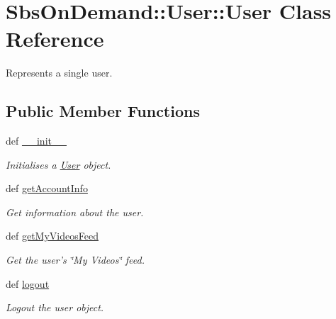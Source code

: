 \hypertarget{class_sbs_on_demand_1_1_user_1_1_user}{
\section{\-Sbs\-On\-Demand\-:\-:\-User\-:\-:\-User \-Class \-Reference}
\label{class_sbs_on_demand_1_1_user_1_1_user}
}


\-Represents a single user.  


\subsection*{\-Public \-Member \-Functions}
\begin{DoxyCompactItemize}
\item 
def \hyperlink{class_sbs_on_demand_1_1_user_1_1_user_a1d355dd122975f8c5b764ca24d115b96}{\-\_\-\-\_\-init\-\_\-\-\_\-}
\begin{DoxyCompactList}\small\item\em \-Initialises a \hyperlink{class_sbs_on_demand_1_1_user_1_1_user}{\-User} object. \end{DoxyCompactList}\item 
def \hyperlink{class_sbs_on_demand_1_1_user_1_1_user_acf32376dd3f09e4de18bebbdcb356a73}{get\-Account\-Info}
\begin{DoxyCompactList}\small\item\em \-Get information about the user. \end{DoxyCompactList}\item 
def \hyperlink{class_sbs_on_demand_1_1_user_1_1_user_aab36a7cd104fccd2b5f38d7c79eb8dcb}{get\-My\-Videos\-Feed}
\begin{DoxyCompactList}\small\item\em \-Get the user's \char`\"{}\-My Videos\char`\"{} feed. \end{DoxyCompactList}\item 
\hypertarget{class_sbs_on_demand_1_1_user_1_1_user_a4d5a79a51293e23f0740315a76ab9a5b}{
def \hyperlink{class_sbs_on_demand_1_1_user_1_1_user_a4d5a79a51293e23f0740315a76ab9a5b}{logout}}
\label{class_sbs_on_demand_1_1_user_1_1_user_a4d5a79a51293e23f0740315a76ab9a5b}

\begin{DoxyCompactList}\small\item\em \-Logout the user object. \end{DoxyCompactList}\end{DoxyCompactItemize}
